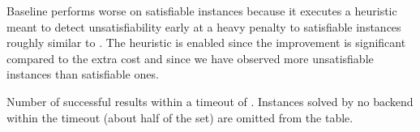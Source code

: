 Baseline performs worse on satisfiable instances because it executes a heuristic
meant to detect unsatisfiability early at a heavy penalty to satisfiable
instances roughly similar to \cite{approximate-parikh}. The heuristic is enabled
since the improvement is significant compared to the extra cost and since we
have observed more unsatisfiable instances than satisfiable ones.

\begin{table}
  \begin{center}
  
  \end{center}
  \caption{Number of successful results within a timeout of \RuntimeTimeout{}.
  Instances solved by no backend within the timeout (about half of the set) are
  omitted from the table.}\label{tab:solve-status}
\end{table}

